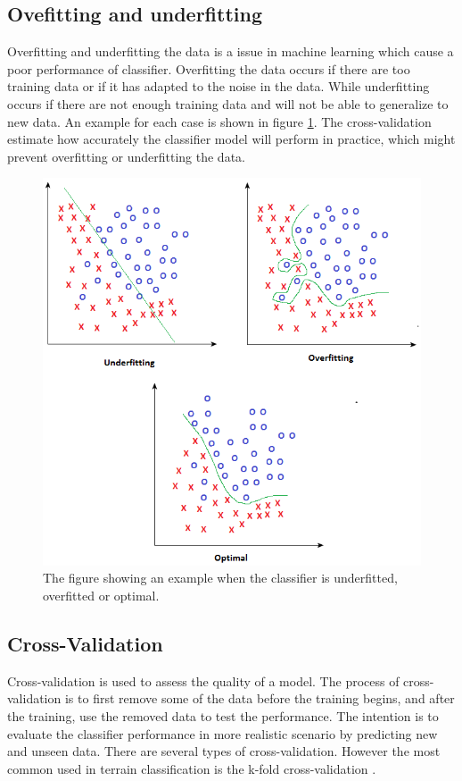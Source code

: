 \documentclass[USenglish]{ifimaster}  %
\begin{document}
\subsection{Ovefitting and underfitting}
Overfitting and underfitting the data is a issue in machine learning which cause a poor performance of classifier. Overfitting the data occurs if there are too training data or if it has adapted to the noise in the data. While underfitting occurs if there are not enough training data and will not be able to generalize to new data. An example for each case is shown in figure \ref{fig:fitting}. The cross-validation estimate how accurately the classifier model will perform in practice, which might prevent overfitting or underfitting the data.
\begin{figure}[h]
    \centering
    \includegraphics[scale=0.6]{Figures/All.png}
    \caption{The figure showing an example when the classifier is underfitted, overfitted or optimal.}
    \label{fig:fitting}
\end{figure}
\FloatBarrier

\subsection{Cross-Validation}
Cross-validation is used to assess the quality of a model. The process of cross-validation is to first remove some of the data before the training begins, and after the training, use the removed data to test the performance. The intention is to evaluate the classifier performance in more realistic scenario by predicting new and unseen data. There are several types of cross-validation. However the most common used in terrain classification is the k-fold cross-validation \cite{6784609,6386243,Hoffmann20141790,6849778,7387710}. 
\end{document}
